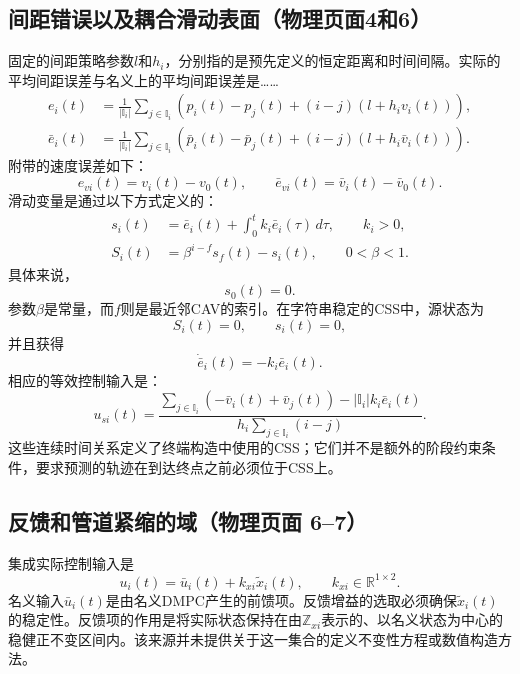 \documentclass{article}
\begin{document}
\subsection*{间距错误以及耦合滑动表面（物理页面4和6）}
固定的间距策略参数$l$和$h_i$，分别指的是预先定义的恒定距离和时间间隔。实际的平均间距误差与名义上的平均间距误差是……
\begin{align}
e_i(t)&=\frac{1}{|\mathbb I_i|}\sum_{j\in\mathbb I_i}
\left(p_i(t)-p_j(t)+(i-j)(l+h_iv_i(t))\right),\tag{4}\\
\bar e_i(t)&=\frac{1}{|\mathbb I_i|}\sum_{j\in\mathbb I_i}
\left(\bar p_i(t)-\bar p_j(t)+(i-j)(l+h_i\bar v_i(t))\right).\tag{5}
\end{align}
附带的速度误差如下：
\[
e_{vi}(t)=v_i(t)-v_0(t),\qquad
\bar e_{vi}(t)=\bar v_i(t)-\bar v_0(t).
\]
滑动变量是通过以下方式定义的：
\begin{align}
s_i(t)&=\bar e_i(t)+\int_0^t k_i\bar e_i(\tau)\,d\tau,
\qquad k_i>0,\tag{8}\\
S_i(t)&=\beta^{i-f}s_f(t)-s_i(t),\qquad 0<\beta<1.\tag{9}
\end{align}
具体来说，
\[
s_0(t)=0.
\]
参数$\beta$是常量，而$f$则是最近邻CAV的索引。在字符串稳定的CSS中，源状态为
\[
S_i(t)=0,\qquad s_i(t)=0,
\]
并且获得
\begin{equation}
\dot{\bar e}_i(t)=-k_i\bar e_i(t).
\tag{10}
\end{equation}
相应的等效控制输入是：
\begin{equation}
u_{si}(t)=
\frac{\displaystyle\sum_{j\in\mathbb I_i}
\left(-\bar v_i(t)+\bar v_j(t)\right)-|\mathbb I_i|k_i\bar e_i(t)}
{\displaystyle h_i\sum_{j\in\mathbb I_i}(i-j)}.
\tag{11}
\end{equation}
这些连续时间关系定义了终端构造中使用的CSS；它们并不是额外的阶段约束条件，要求预测的轨迹在到达终点之前必须位于CSS上。

\subsection*{反馈和管道紧缩的域（物理页面 6–7）}
集成实际控制输入是
\begin{equation}
u_i(t)=\bar u_i(t)+k_{xi}\widetilde x_i(t),
\qquad k_{xi}\in\mathbb R^{1\times2}.
\tag{12}
\end{equation}
名义输入$\bar u_i(t)$是由名义DMPC产生的前馈项。反馈增益的选取必须确保$\widetilde x_i(t)$的稳定性。反馈项的作用是将实际状态保持在由$\mathbb Z_{xi}$表示的、以名义状态为中心的稳健正不变区间内。该来源并未提供关于这一集合的定义不变性方程或数值构造方法。
\end{document}
